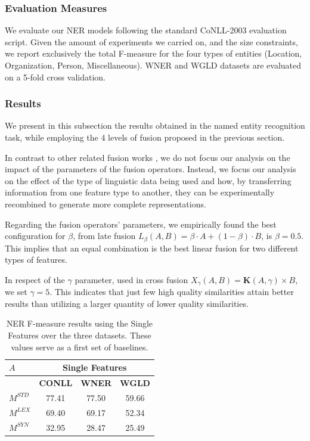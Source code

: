 \subsubsection{Evaluation Measures}
We evaluate our NER models following the standard CoNLL-2003 evaluation script. Given the amount of experiments we carried on, and the size constraints, we report exclusively the total F-measure for the four types of entities (Location, Organization, Person, Miscellaneous). WNER and WGLD datasets are evaluated on a 5-fold cross validation.

\subsubsection{Results}
We present in this subsection the results obtained in the named entity recognition task, while employing the 4 levels of fusion proposed in the previous section.

In contrast to other related fusion works \cite{Ah-PineCC15,ClinchantAC11,GialampoukidisM16}, we do not focus our analysis on the impact of the parameters of the fusion operators. Instead, we focus our analysis on the effect of the type of linguistic data being used and how, by transferring information from one feature type to another, they can be experimentally recombined to generate more complete representations.

Regarding the fusion operators' parameters, we empirically found the best configuration for $\beta$, from late fusion $L_\beta(A,B) = \beta \cdot A + (1 - \beta)\cdot B$, is $\beta=0.5$. This implies that an equal combination is the best linear fusion for two different types of features.

In respect of the $\gamma$ parameter, used in cross fusion $X_{\gamma}(A,B) = \mathbf{K}(A,\gamma) \times B$, we set $\gamma=5$. This indicates that just few high quality similarities attain better results than utilizing a larger quantity of lower quality similarities.

\begin{table}[!tbp]
\centering
\caption{NER F-measure results using the Single Features over the three datasets. These values serve as a first set of baselines. }
\label{tab:ner-blines}
\begin{tabular}{@{}lccc@{}}
\toprule
$A$                           & \multicolumn{3}{c}{\textbf{Single Features}} \\ \midrule
                & \textbf{CONLL}    & \textbf{WNER}     & \textbf{WGLD}    \\ \cmidrule{2-4}
$M^{\scriptscriptstyle STD}$                        & 77.41    & 77.50    & 59.66   \\
$M^{\scriptscriptstyle LEX}$                       & 69.40    & 69.17    & 52.34   \\
$M^{\scriptscriptstyle SYN}$                        & 32.95    & 28.47    & 25.49   \\ \bottomrule
\end{tabular}

\end{table}
